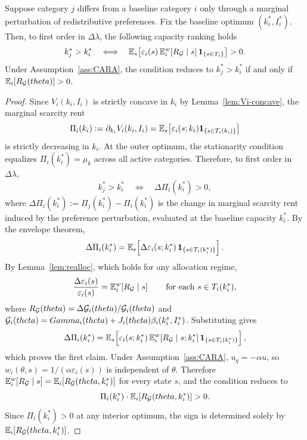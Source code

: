 \documentclass[master.tex]{subfiles}
\begin{document}
\begin{theorem}\label{thm:cat-order}
Suppose category \(j\) differs from a baseline category \(i\) only through a marginal perturbation of redistributive preferences. Fix the baseline optimum \((k_i^\ast,I_i^\ast)\). Then, to first order in \(\Delta\lambda\), the following capacity ranking holds
\[
k_j^\ast>k_i^\ast
\quad\Longleftrightarrow\quad
\mathbb{E}_s\!\left[
\varepsilon_i(s)\,
\mathbb{E}_i^w\!\left[R_{\mathcal G}\mid s\right]
\mathbf{1}_{\{s\in T_i\}}
\right]>0.
\]
Under Assumption~\ref{ass:CARA}, the condition reduces to $k_j^\ast>k_i^\ast$ if and only if $\mathbb{E}_i[R_{\mathcal G}(theta)]>0$. 
\end{theorem}


\begin{proof}
Since $V_i(k_i,I_i)$ is strictly concave in $k_i$ by Lemma~\ref{lem:Vi-concave}, the marginal scarcity rent
\[
\Pi_i(k_i):=\partial_{k_i}V_i(k_i,I_i)
=
\mathbb{E}_s\!\left[
\varepsilon_i(s;k_i)\mathbf{1}_{\{s\in T_i(k_i)\}}
\right]
\]
is strictly decreasing in $k_i$. At the outer optimum, the stationarity condition equalizes $\Pi_i(k_i^\ast)=\mu_k$ across all active categories. Therefore, to first order in $\Delta\lambda$,
\[
k_j^\ast>k_i^\ast
\quad\Longleftrightarrow\quad
\Delta \Pi_i(k_i^\ast)>0,
\]
where $\Delta \Pi_i(k_i^\ast):=\Pi_j(k_i^\ast)-\Pi_i(k_i^\ast)$ is the change in marginal scarcity rent induced by the preference perturbation, evaluated at the baseline capacity $k_i^\ast$. By the envelope theorem,
\[
\Delta \Pi_i(k_i^\ast)
=
\mathbb{E}_s\!\left[
\Delta \varepsilon_i(s;k_i^\ast)\,
\mathbf{1}_{\{s\in T_i(k_i^\ast)\}}
\right].
\]
By Lemma~\ref{lem:realloc}, which holds for any allocation regime,
\[
\frac{\Delta\varepsilon_i(s)}{\varepsilon_i(s)}
=
\mathbb{E}_i^w\!\left[R_{\mathcal{G}}\mid s\right]
\qquad
\text{for each } s\in T_i(k_i^\ast),
\]
where $R_{\mathcal{G}}(theta)=\Delta \mathcal{G}_i(theta)/\mathcal{G}_i(theta)$ and $\mathcal{G}_i(theta)=Gamma_i(theta)+J_i(theta)\beta_i(k_i^\ast,I_i^\ast)$. Substituting gives
\[
\Delta \Pi_i(k_i^\ast)
=
\mathbb{E}_s\!\left[
\varepsilon_i(s;k_i^\ast)\,
\mathbb{E}_i^w\!\left[R_{\mathcal{G}}\mid s;k_i^\ast\right]
\mathbf{1}_{\{s\in T_i(k_i^\ast)\}}
\right],
\]
which proves the first claim. Under Assumption~\ref{ass:CARA}, $u_q=-\alpha u$, so $w_i(\theta,s)=1/(\alpha\varepsilon_i(s))$ is independent of $\theta$. Therefore $\mathbb{E}_i^w[R_{\mathcal{G}}\mid s]=\mathbb{E}_i[R_{\mathcal{G}}(theta,k_i^\ast)]$ for every state $s$, and the condition reduces to
\[
\Pi_i(k_i^\ast)\cdot\mathbb{E}_i[R_{\mathcal{G}}(theta,k_i^\ast)]>0.
\]
Since $\Pi_i(k_i^\ast)>0$ at any interior optimum, the sign is determined solely by $\mathbb{E}_i[R_{\mathcal{G}}(theta,k_i^\ast)]$.
\end{proof}
\end{document}
